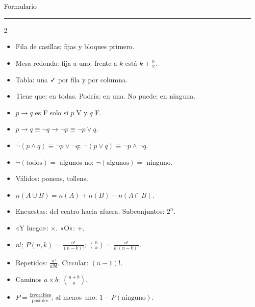 \makeatletter
\cleardoublepage\renewcommand{\zuka@mundoactual}{Formulario}
{\sffamily\fontsize{26}{30}\selectfont\firalight Formulario\par}\vspace{2pt}
{\color{zlime}\rule{18mm}{1.6pt}}\par\vspace{6pt}

\begin{multicols}{2}\small
{}
\begin{itemize}
  \item Fila de casillas; fijas y bloques primero.
  \item Mesa redonda: fija a uno; frente a $k$ está $k \pm \tfrac n2$.
  \item Tabla: una ✓ por fila y por columna.
  \item Tiene que: en todas. Podría: en una. No puede: en ninguna.
\end{itemize}
\begin{itemize}
  \item $p \to q$ es F solo si $p$ V y $q$ F.
  \item $p \to q \equiv \neg q \to \neg p \equiv \neg p \vee q$.
  \item $\neg(p \wedge q) \equiv \neg p \vee \neg q$; $\neg(p \vee q) \equiv \neg p \wedge \neg q$.
  \item $\neg(\text{todos}) =$ algunos no; $\neg(\text{algunos}) =$ ninguno.
  \item Válidos: ponens, tollens.
\end{itemize}
\begin{itemize}
  \item $n(A \cup B) = n(A) + n(B) - n(A \cap B)$.
  \item Encuestas: del centro hacia afuera. Subconjuntos: $2^n$.
\end{itemize}
\columnbreak
{}
\begin{itemize}
  \item «Y luego»: $\times$. «O»: $+$.
  \item $n!$; $P(n, k) = \tfrac{n!}{(n-k)!}$; $\binom nk = \tfrac{n!}{k!(n-k)!}$.
  \item Repetidos: $\tfrac{n!}{a!b!}$. Circular: $(n - 1)!$.
  \item Caminos $a \times b$: $\binom{a+b}{a}$.
  \item $P = \tfrac{\text{favorables}}{\text{posibles}}$; al menos uno: $1 - P(\text{ninguno})$.

\end{itemize}
\end{multicols}
